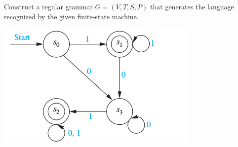 \documentclass[../main.tex]{subfiles}
\begin{document}
Construct a regular grammar $G = (V, T, S, P)$ that generates the language recognized by the given finite-state machine.

\includegraphics[width=\textwidth]{img/Q13_4_17}
\solution
\end{document}
